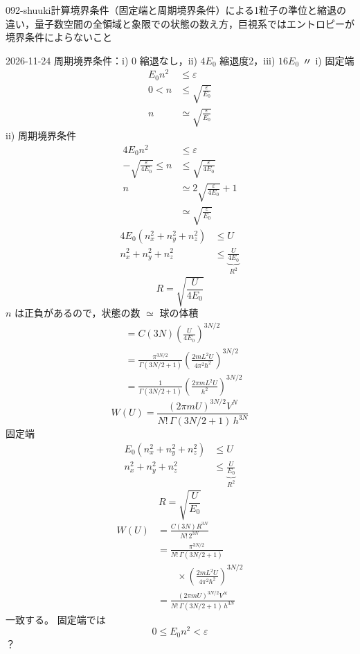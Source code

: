 \documentclass[uplatex,dvipdfmx,a4paper,11pt]{jsarticle}
\begin{document}
\begin{mondai}{092-shuuki}{計算}{境界条件（固定端と周期境界条件）による1粒子の準位と縮退の違い，量子数空間の全領域と象限での状態の数え方，巨視系ではエントロピーが境界条件によらないこと}
\begin{kotaeutsushi}{2026-11-24}
周期境界条件：i) $0$ 縮退なし，ii) $4E_{0}$ 縮退度2，iii) $16E_{0}$ 〃
i) 固定端
\begin{align*}
E_{0}n^{2}&\le\varepsilon\\
0<n&\le\sqrt{\frac{\varepsilon}{E_{0}}}\\
n&\simeq\sqrt{\frac{\varepsilon}{E_{0}}}
\end{align*}
ii) 周期境界条件
\begin{align*}
4E_{0}n^{2}&\le\varepsilon\\
-\sqrt{\frac{\varepsilon}{4E_{0}}}\le n&\le\sqrt{\frac{\varepsilon}{4E_{0}}}\\
n&\simeq2\sqrt{\frac{\varepsilon}{4E_{0}}}+1\\
&\simeq\sqrt{\frac{\varepsilon}{E_{0}}}
\end{align*}
\begin{align*}
4E_{0}(n_{x}^{2}+n_{y}^{2}+n_{z}^{2})&\le U\\
n_{x}^{2}+n_{y}^{2}+n_{z}^{2}&\le\underbrace{\frac{U}{4E_{0}}}_{R^{2}}
\end{align*}
\[ R=\sqrt{\frac{U}{4E_{0}}} \]
$n$ は正負があるので，状態の数 $\simeq$ 球の体積
\begin{align*}
&=C(3N)\left(\frac{U}{4E_{0}}\right)^{3N/2}\\
&=\frac{\pi^{3N/2}}{\Gamma(3N/2+1)}\left(\frac{2mL^{2}U}{4\pi^{2}\hbar^{2}}\right)^{3N/2}\\
&=\frac{1}{\Gamma(3N/2+1)}\left(\frac{2\pi mL^{2}U}{h^{2}}\right)^{3N/2}
\end{align*}
\[ W(U)=\frac{(2\pi mU)^{3N/2}V^{N}}{N!\,\Gamma(3N/2+1)\,h^{3N}} \]
固定端
\begin{align*}
E_{0}(n_{x}^{2}+n_{y}^{2}+n_{z}^{2})&\le U\\
n_{x}^{2}+n_{y}^{2}+n_{z}^{2}&\le\underbrace{\frac{U}{E_{0}}}_{R^{2}}
\end{align*}
\[ R=\sqrt{\frac{U}{E_{0}}} \]
\begin{align*}
W(U)&=\frac{C(3N)R^{3N}}{N!\,2^{3N}}\\
&=\frac{\pi^{3N/2}}{N!\,\Gamma(3N/2+1)}\\
&\qquad\times\left(\frac{2mL^{2}U}{4\pi^{2}\hbar^{2}}\right)^{3N/2}\\
&=\frac{(2\pi mU)^{3N/2}V^{N}}{N!\,\Gamma(3N/2+1)\,h^{3N}}
\end{align*}
一致する。
固定端では
\[ 0\le E_{0}n^{2}<\varepsilon \]
？

\end{kotaeutsushi}
\end{mondai}
\end{document}
